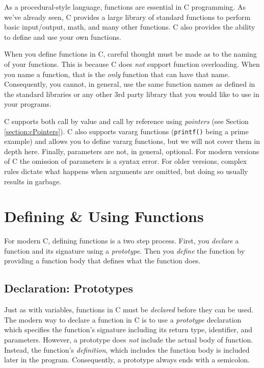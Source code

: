 

As a procedural-style language, functions are essential in C 
programming.  As we've already seen, C provides a large
library of standard functions to perform basic input/output, 
math, and many other functions.  C also provides the ability 
to define and use your own functions.

When you define functions in C, careful thought must be 
made as to the naming of your functions.  This is because
C does \emph{not} support function overloading.  When you
name a function, that is the \emph{only} function that can
have that name.  Consequently, you cannot, in general,
use the same function names as defined in the standard 
libraries or any other 3rd party library that you would like
to use in your programs.

C supports both call by value and call by reference using
\emph{pointers} (see Section \ref{section:cPointers}).  C
also supports vararg functions (\texttt{printf()} being
a prime example) and allows you to define vararg functions, 
but we will not cover them in depth here.  Finally, 
parameters are not, in general, optional.  For modern 
versions of C the omission of parameters is a syntax error.
For older versions, complex rules dictate what happens
when arguments are omitted, but doing so usually results
in garbage.

\section{Defining \& Using Functions}

For modern C, defining functions is a two step process.  First,
you \emph{declare} a function and its signature using a \emph{prototype}.  
Then you \emph{define} the
function by providing a function body that defines what the
function does.

\subsection{Declaration: Prototypes}

Just as with variables, functions in C must be \emph{declared} before
they can be used.  The modern way to declare a function in C is to
use a \emph{prototype} declaration which specifies the function's
signature including its return type, identifier, and parameters.  However,
a prototype does \emph{not} include the actual body of function. 
Instead, the function's \emph{definition}, which includes the function body is
included later in the program.  Consequently, a prototype always 
ends with a semicolon.  

